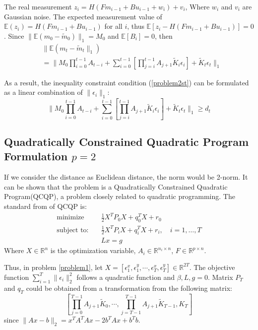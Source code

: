 \documentclass[letterpaper, 10 pt, conference]{ieeeconf}  %
\begin{document}
The real measurement $z_i = H(Fm_{i-1} +Bu_{i-1}+w_i)+v_i$, Where $w_i$ and $v_i$ are Gaussian noise. The expected measurement value of $\mathbb{E}(z_i)=H(Fm_{i-1}+Bu_{i-1})$ for all $i$, thus $\mathbb{E}[z_i-H(Fm_{i-1}+Bu_{i-1})]=0$. Since $\lVert \mathbb{E}(m_0-\tilde{m}_0)\lVert_1  = M_0$ and $\mathbb{E}[B_i] = 0$, then
\begin{equation}
\begin{split}
& \lVert \mathbb{E}\left(m_t-\tilde{m}_t\lVert_1  \right)\\
&=  \Bigg\lVert M_0\prod_{i=0}^{t-1}A_{t-i} +\sum_{i=0}^{t-1} \left[\prod_{j=i}^{t-1}A_{j+1} \tilde{K}_i \epsilon_i\right] +  \tilde{K}_t\epsilon_t \Bigg\lVert_1
\end{split}
\end{equation}

As a result, the  inequality  constraint condition (\ref{problem2st}) can be formulated as a linear combination of $\lVert \epsilon_i\lVert_1 $:   
\begin{equation} \label{replacePro2}
\Bigg\lVert M_0\prod_{i=0}^{t-1}A_{t-i} +\sum_{i=0}^{t-1} \left[\prod_{j=i}^{t-1}A_{j+1} \tilde{K}_i \epsilon_i\right] +  \tilde{K}_t\epsilon_t \Bigg\lVert_1 \ge d_t
\end{equation}

\subsection{Quadratically Constrained Quadratic Program Formulation $p=2$}
If we consider the distance as Euclidean distance, the norm would be 2-norm. It can be shown that the problem is a Quadratically Constrained Quadratic Program(QCQP)\cite{boyd2004convex}, a problem closely related to quadratic programming. The standard from of QCQP is:
\begin{equation}
\begin{split}
\text{minimize} \quad &\frac{1}{2} X^TP_0X+q_0^TX+r_0\\
\text{subject to:}\quad &\frac{1}{2} X^TP_iX+q_i^TX+r_i,\quad i=1,\dots,T\\
&Lx=g
\end{split}
\end{equation}
Where $X\in \mathbb{R}^n$ is the optimization variable, $A_i\in \mathbb{R}^{n_i \times n}$, $F \in \mathbb{R}^{p\times n}$.

Thus, in problem \ref{problem1}, let $X=[\epsilon^x_{1},\epsilon^y_{1},\cdots,\epsilon^x_{T},\epsilon^y_{T}]\in \mathbb{R}^{2T}$. The objective function $\sum_{i=1}^T \lVert \epsilon_i \lVert_2^2$ follows a quadratic function and $\beta,L,g =0$. Matrix $P_T$ and $q_T$  could be obtained from a transformation from the following matrix: $$\left[\prod_{j=0}^{T-1}A_{j+1} \tilde{K}_0,\cdots, \prod_{j=T-1}^{T-1}A_{j+1} \tilde{K}_{T-1}, {K}_T \right]$$
since $\lVert Ax-b \lVert_2=x^TA^TAx-2b^TAx+b^Tb$.
\end{document}
